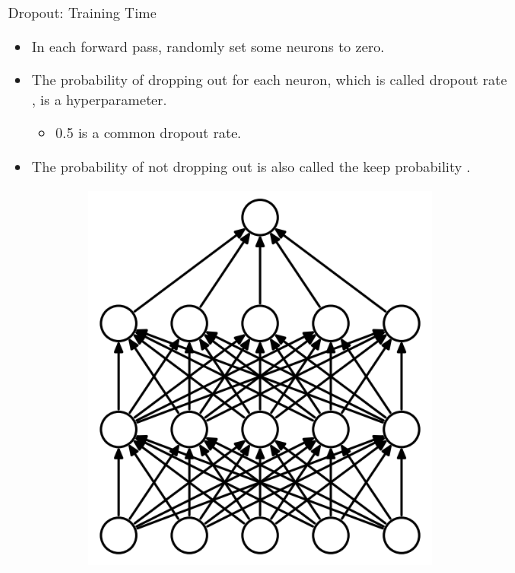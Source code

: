 \documentclass[compress,oilve,t]{beamer}
\newcommand{\tc}[2]{
	\textcolor{#1}{\hspace{-2pt}#2\hspace{-2pt}}
}
\begin{document}
\begin{frame}{Dropout: Training Time}
	\begin{itemize}
		\item In each forward pass, \tc{keywords}{randomly} set some neurons to zero.
		\medskip
		\item The probability of dropping out for each neuron, which is called \tc{keywords}{dropout rate}, is a hyperparameter.
		\begin{itemize}
			\item 0.5 is a common dropout rate.
		\end{itemize}
		\medskip
		\item The probability of not dropping out is also called the \tc{keywords}{keep probability}.
	\end{itemize}
	\begin{figure}[H]
		\centering
		\begin{subfigure}[b]{0.45\textwidth}
			\centering
			\includegraphics[height=0.4\textheight]{Figs/Dropout-before.png}
		\end{subfigure}
		\begin{subfigure}[b]{0.45\textwidth}
			\centering

\end{subfigure}
\end{figure}
\end{frame}
\end{document}
